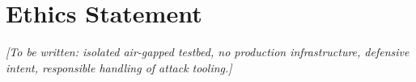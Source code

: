 \chapter*{Ethics Statement}
\noindent\emph{[To be written: isolated air-gapped testbed, no production infrastructure, defensive intent, responsible handling of attack tooling.]}
